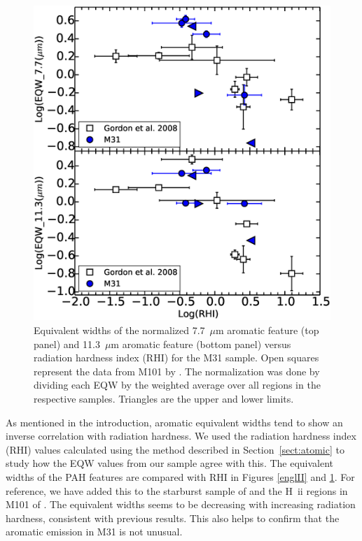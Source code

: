 \begin{figure}
\centering
\includegraphics[scale=0.30]{./Gordvsmy.eps}
\caption{Equivalent widths of the normalized 7.7~$\mu$m aromatic feature (top panel) and 11.3~$\mu$m aromatic feature (bottom panel) versus 
radiation hardness index (RHI) for the M31 sample. Open squares represent the data from M101 by \citet{Gordon:2008lr}. 
The normalization was done by dividing each EQW by the weighted average over all regions in the respective samples. Triangles are the upper and lower limits.}
\label{gordII}
\end{figure}

As mentioned in the introduction, aromatic equivalent widths tend to show an inverse correlation with radiation hardness. We used the radiation hardness index (RHI) values calculated using the method described in Section~\ref{sect:atomic} to study how the EQW values from our sample agree with this.
The equivalent widths of the PAH features are compared with RHI in Figures \ref{englII} and \ref{gordII}.
For reference, we have added this to the starburst sample of \citet{Engelbracht_2008} and the H~{\sc ii} regions in M101 of \citet{Gordon:2008lr}. The equivalent widths seems to be decreasing with increasing radiation hardness, consistent with previous results. This also helps to confirm that the aromatic emission in M31 is not unusual. 

